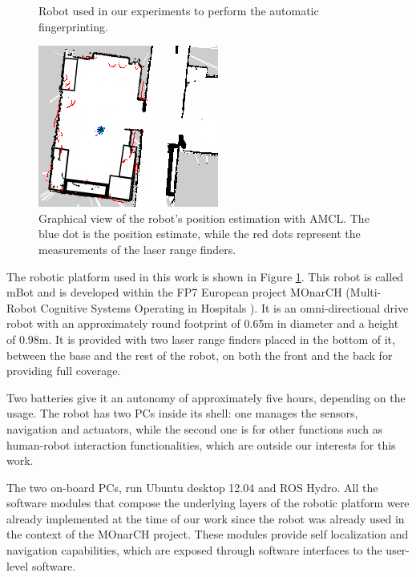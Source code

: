 \begin{figure}
    \caption{Robot used in our experiments to perform the automatic fingerprinting.}
     \label{robot}
\end{figure}


\begin{figure}
    \centering
    \includegraphics[scale=0.64]{pictures/amcl.png}
    \caption{Graphical view of the robot's position estimation with AMCL. The blue dot is the position estimate, while the red dots represent the measurements of the laser range finders.}
     \label{amcl}
\end{figure}


The robotic platform used in this work is shown in Figure \ref{robot}. This robot is called mBot \cite{Messias2014robotic} and is developed within the FP7 European project MOnarCH (Multi-Robot Cognitive Systems Operating in Hospitals \cite{monarch2013}).
It is an omni-directional drive robot with an approximately round footprint of 0.65m in diameter and a height of 0.98m.
It is provided with two laser range finders placed in the bottom of it, between the base and the rest of the robot, on both the front and the back for providing full coverage.

Two batteries give it an autonomy of approximately five hours, depending on the usage.
The robot has two PCs inside its shell: one manages the sensors, navigation and actuators, while the second one is for other functions such as human-robot interaction functionalities, which are outside our interests for this work.

The two on-board PCs, run Ubuntu desktop 12.04 and ROS Hydro. All the software modules that compose the underlying layers of the robotic platform were already implemented at the time of our work since the robot was already used in the context of the MOnarCH  project. These modules provide self localization and navigation capabilities, which are exposed through software interfaces to the user-level software.

